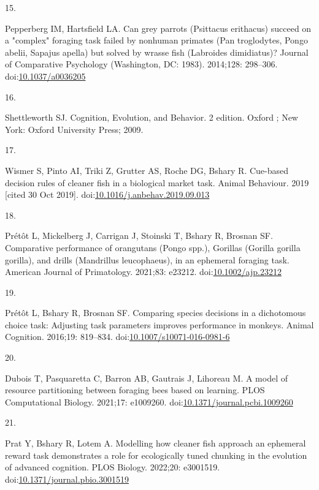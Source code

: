 \documentclass[10pt,letterpaper]{article}
\newlength{\cslhangindent}
\newlength{\csllabelwidth}
\newlength{\cslentryspacingunit} %
\newenvironment{CSLReferences}[2] %
 {%
  \setlength{\parindent}{0pt}
  \ifodd #1
  \let\oldpar\par
  \def\par{\hangindent=\cslhangindent\oldpar}
  \fi
  \setlength{\parskip}{#2\cslentryspacingunit}
 }%
 {}
\newcommand{\CSLLeftMargin}[1]{\parbox[t]{\csllabelwidth}{#1}}
\newcommand{\CSLRightInline}[1]{\parbox[t]{\linewidth - \csllabelwidth}{#1}\break}
\begin{document}
\begin{CSLReferences}{0}{0}
\leavevmode{}%
\CSLLeftMargin{15. }
\CSLRightInline{Pepperberg IM, Hartsfield LA. Can grey parrots
({Psittacus} erithacus) succeed on a "complex" foraging task failed by
nonhuman primates ({Pan} troglodytes, {Pongo} abelii, {Sapajus} apella)
but solved by wrasse fish ({Labroides} dimidiatus)? Journal of
Comparative Psychology (Washington, DC: 1983). 2014;128: 298--306.
doi:\href{https://doi.org/10.1037/a0036205}{10.1037/a0036205}}

\leavevmode{}%
\CSLLeftMargin{16. }
\CSLRightInline{Shettleworth SJ. Cognition, {Evolution}, and {Behavior}.
2 edition. Oxford ; New York: Oxford University Press; 2009. }

\leavevmode{}%
\CSLLeftMargin{17. }
\CSLRightInline{Wismer S, Pinto AI, Triki Z, Grutter AS, Roche DG,
Bshary R. Cue-based decision rules of cleaner fish in a biological
market task. Animal Behaviour. 2019 {[}cited 30 Oct 2019{]}.
doi:\href{https://doi.org/10.1016/j.anbehav.2019.09.013}{10.1016/j.anbehav.2019.09.013}}

\leavevmode{}%
\CSLLeftMargin{18. }
\CSLRightInline{Prétôt L, Mickelberg J, Carrigan J, Stoinski T, Bshary
R, Brosnan SF. Comparative performance of orangutans ({Pongo} spp.),
Gorillas ({Gorilla} gorilla gorilla), and drills ({Mandrillus}
leucophaeus), in an ephemeral foraging task. American Journal of
Primatology. 2021;83: e23212.
doi:\href{https://doi.org/10.1002/ajp.23212}{10.1002/ajp.23212}}

\leavevmode{}%
\CSLLeftMargin{19. }
\CSLRightInline{Prétôt L, Bshary R, Brosnan SF. Comparing species
decisions in a dichotomous choice task: Adjusting task parameters
improves performance in monkeys. Animal Cognition. 2016;19: 819--834.
doi:\href{https://doi.org/10.1007/s10071-016-0981-6}{10.1007/s10071-016-0981-6}}

\leavevmode{}%
\CSLLeftMargin{20. }
\CSLRightInline{Dubois T, Pasquaretta C, Barron AB, Gautrais J, Lihoreau
M. A model of resource partitioning between foraging bees based on
learning. PLOS Computational Biology. 2021;17: e1009260.
doi:\href{https://doi.org/10.1371/journal.pcbi.1009260}{10.1371/journal.pcbi.1009260}}

\leavevmode{}%
\CSLLeftMargin{21. }
\CSLRightInline{Prat Y, Bshary R, Lotem A. Modelling how cleaner fish
approach an ephemeral reward task demonstrates a role for ecologically
tuned chunking in the evolution of advanced cognition. PLOS Biology.
2022;20: e3001519.
doi:\href{https://doi.org/10.1371/journal.pbio.3001519}{10.1371/journal.pbio.3001519}}


\end{CSLReferences}
\end{document}
